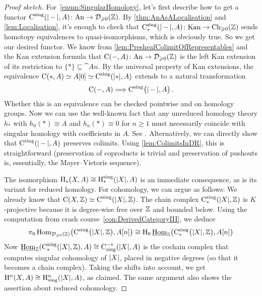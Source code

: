 \begin{proof}[Proof sketch]
	For~\cref{enum:SingularHomology}, let's first describe how to get a functor $\C^{\mathrm{sing}}(\abs*{\,-\,},A)\colon\cat{An}\rightarrow\Dd_{\geqslant 0}(\IZ)$. By \cref{thm:AnAsALocalisation} and \cref{lem:Localisation}, it's enough to check that $\C_*^\mathrm{sing}(\abs{\,-\,},A)\colon \cat{Kan}\rightarrow \Ch_{\geqslant 0}(\IZ)$ sends homotopy equivalences to quasi-isomorphisms, which is obviously true. So we get our desired functor. We know from \cref{lem:PresheafColimitOfRepresentables} and the Kan extension formula that $\operatorname{C}(-,A)\colon \mathrm{An}\rightarrow \mathcal{D}_{\geqslant 0}(\mathbb{Z})$ is the left Kan extension of its restriction to $\{*\}\subseteq \cat{An}$. By the universal property of Kan extensions, the equivalence $\C(*,A)\simeq A[0]\simeq \C^\mathrm{sing}(\abs*{*},A)$ extends to a natural transformation
	\begin{equation*}
		\C(-,A)\Longrightarrow \C^\mathrm{sing}\bigl(\abs*{\,-\,},A\bigr)\,.
	\end{equation*}
	Whether this is an equivalence can be checked pointwise and on homology groups. Now we can use the well-known fact that any unreduced homology theory $h_*$ with $h_0(*)\cong A$ and $h_n(*)\cong 0$ for $n\geqslant 1$ must necessarily coincide with singular homology with coefficients in $A$. See \cite[Theorem~\href{https://pi.math.cornell.edu/~hatcher/AT/AT.pdf\#page=408}{4.59}]{Hatcher}. Alternatively, we can directly show that $\C^{\mathrm{sing}}(\abs*{\,-\,},A)$ preserves colimits. Using \cref{lem:ColimitsInDR}, this is straightforward (preservation of coproducts is trivial and preservation of pushouts is, essentially, the Mayer--Vietoris sequence).
	
	The isomorphism $\H_*(X,A)\cong \H_*^\mathrm{sing}(\abs*{X},A)$ is an immediate consequence, as is its variant for reduced homology. For cohomology, we can argue as follows: We already know that $\C(X,\IZ)\simeq \C^\mathrm{sing}(\abs*{X},\IZ)$. The chain complex $\C_*^\mathrm{sing}(\abs{X},\IZ)$ is $K$-projective because it is degree-wise free over $\mathbb{Z}$ and bounded below. Using the computation from crash course~\cref{con:DerivedCategoryIII}, we deduce
	\begin{equation*}
		\pi_0\Hom_{\Dd_{\geqslant 0}(\IZ)}\bigl(\C^\mathrm{sing}\bigl(\abs{X},\IZ\bigr),A[n]\bigr)\cong \H_0\Hhom_\IZ\bigl(\C_*^\mathrm{sing}\bigl(\abs{X},\IZ\bigr),A[n]\bigr)
	\end{equation*}
	Now $\Hhom_\IZ(\C_*^\mathrm{sing}(\abs{X},\IZ),A)\cong \C_\mathrm{sing}^{-*}(\abs{X},A)$ is the cochain complex that computes singular cohomology of $\abs{X}$, placed in negative degrees (so that it becomes a chain complex). Taking the shifts into account, we get $\H^n(X,A)\cong \H_\mathrm{sing}^n(\abs{X},A)$, as claimed. The same argument also shows the assertion about reduced cohomology.
\end{proof}
